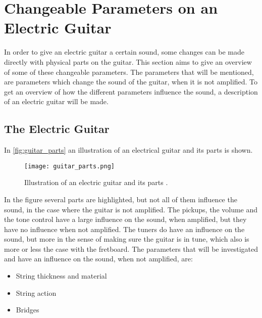 \section{Changeable Parameters on an Electric Guitar}\label{sec:electric_guitar_theory} 

In order to give an electric guitar a certain sound, some changes can be made directly with physical parts on the guitar. This section aims to give an overview of some of these changeable parameters. The parameters that will be mentioned, are parameters which change the sound of the guitar, when it is not amplified.
To get an overview of how the different parameters influence the sound, a description of an electric guitar will be made.

\subsection{The Electric Guitar}

In \autoref{fig:guitar_parts} an illustration of an electrical guitar and its parts is shown.

\begin{figure}[htbp!]
	\centering
		\texttt{[image: guitar\_parts.png]}
		\caption{Illustration of an electric guitar and its parts \cite{coustii}.}
		\label{fig:guitar_parts}
\end{figure}

In the figure several parts are highlighted, but not all of them influence the sound, in the case where the guitar is not amplified. The pickups, the volume and the tone control have a large influence on the sound, when amplified, but they have no influence when not amplified. The tuners do have an influence on the sound, but more in the sense of making sure the guitar is in tune, which also is more or less the case with the fretboard. 
The parameters that will be investigated and have an influence on the sound, when not amplified, are:

\begin{itemize}
 \item String thickness and material
 \item String action
 \item Bridges
\end{itemize}

